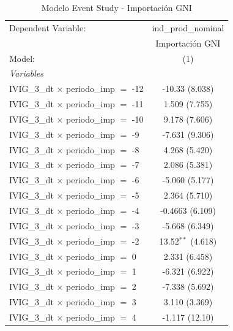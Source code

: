 \documentclass[12pt]{article}
\begin{document}
\setcounter{table}{7}
\begin{table}[htbp]
\centering
\begin{threeparttable}

   \caption{Modelo Event Study - Importación GNI}
   \centering
   \small
   \begin{tabular}{lc}
      \tabularnewline \midrule \midrule
      Dependent Variable:                           & ind\_prod\_nominal\\    
                                                    & Importación GNI \\   
      Model:                                        & (1)\\  
      \midrule
      \emph{Variables}\\
      IVIG\_3\_dt $\times$ periodo\_imp $=$ -12     & -10.33 (8.038)\\   
      IVIG\_3\_dt $\times$ periodo\_imp $=$ -11     & 1.509 (7.755)\\   
      IVIG\_3\_dt $\times$ periodo\_imp $=$ -10     & 9.178 (7.606)\\   
      IVIG\_3\_dt $\times$ periodo\_imp $=$ -9      & -7.631 (9.306)\\   
      IVIG\_3\_dt $\times$ periodo\_imp $=$ -8      & 4.268 (5.420)\\   
      IVIG\_3\_dt $\times$ periodo\_imp $=$ -7      & 2.086 (5.381)\\   
      IVIG\_3\_dt $\times$ periodo\_imp $=$ -6      & -5.060 (5.177)\\   
      IVIG\_3\_dt $\times$ periodo\_imp $=$ -5      & 2.364 (5.710)\\   
      IVIG\_3\_dt $\times$ periodo\_imp $=$ -4      & -0.4663 (6.109)\\   
      IVIG\_3\_dt $\times$ periodo\_imp $=$ -3      & -5.668 (6.349)\\   
      IVIG\_3\_dt $\times$ periodo\_imp $=$ -2      & 13.52$^{**}$ (4.618)\\   
      IVIG\_3\_dt $\times$ periodo\_imp $=$ 0       & 2.331 (6.458)\\   
      IVIG\_3\_dt $\times$ periodo\_imp $=$ 1       & -6.321 (6.922)\\   
      IVIG\_3\_dt $\times$ periodo\_imp $=$ 2       & -7.338 (5.692)\\   
      IVIG\_3\_dt $\times$ periodo\_imp $=$ 3       & 3.110 (3.369)\\   
      IVIG\_3\_dt $\times$ periodo\_imp $=$ 4       & -1.117 (12.10)\\   

\end{tabular}
\end{threeparttable}
\end{table}
\end{document}
